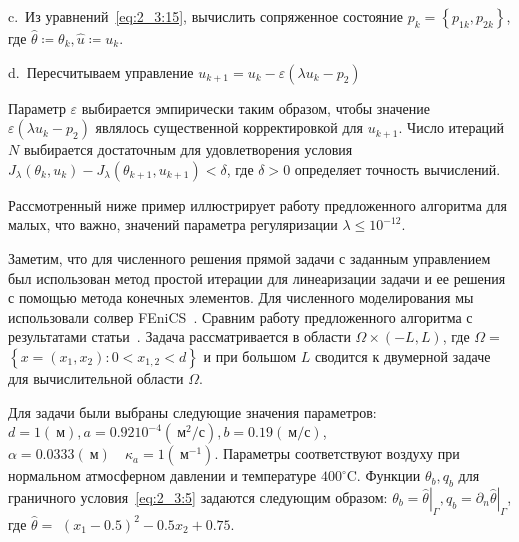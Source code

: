 \hspace{1cm} c.\ Из уравнений~\eqref{eq:2_3:15}, вычислить сопряженное
состояние $p_{k}=\left\{p_{1 k}, p_{2 k}\right\}$,
где $\widehat{\theta} \coloneqq \theta_{k}, \widehat{u} \coloneqq u_{k}$.

\hspace{1cm} d.\ Пересчитываем управление
$u_{k+1}=u_{k}-\varepsilon\left(\lambda u_{k}-p_{2}\right)$

Параметр $\varepsilon$ выбирается эмпирически таким образом, чтобы
значение $\varepsilon\left(\lambda u_{k}-p_{2}\right)$ являлось
существенной корректировкой для $u_{k+1}$.
Число итераций $N$ выбирается достаточным для
удовлетворения условия $J_{\lambda}\left(\theta_{k}, u_{k}\right)
-J_{\lambda}\left(\theta_{k+1}, u_{k+1}\right)<\delta$, где $\delta>0$
определяет точность вычислений.

Рассмотренный ниже пример иллюстрирует работу предложенного
алгоритма для малых, что важно, значений параметра регуляризации
$\lambda \leq 10^{-12}$.


Заметим, что для численного решения прямой задачи с заданным управлением
был использован метод простой итерации для линеаризации задачи и ее решения
с помощью метода конечных элементов.
Для численного моделирования мы использовали солвер FEniCS~\cite{fenics, dolfin}.
Сравним работу предложенного
алгоритма с результатами статьи~\cite{Chebotarev2019Problem}.
Задача рассматривается в области $\Omega \times(-L, L)$,
где $\Omega=$ $\left\{x=\left(x_{1}, x_{2}\right): 0<x_{1,2}<d\right\}$
и при большом $L$ сводится к двумерной задаче для вычислительной
области $\Omega$.

Для задачи были выбраны следующие значения параметров:
$d=1(\mathrm{~м}), a=0.9210^{-4}\left(\mathrm{~м}^{2} / \mathrm{с}\right),
b=0.19(\mathrm{~м} / \mathrm{с})$, $\alpha=0.0333(\mathrm{~м})
\quad \kappa_{a}=1\left(\mathrm{~м}^{-1}\right)$.
Параметры соответствуют воздуху при нормальном атмосферном давлении
и температуре $400^{\circ} \mathrm{C}$.
Функции $\theta_{b}, q_{b}$ для граничного условия~\eqref{eq:2_3:5}
задаются следующим образом: $\theta_{b}=\left.\widehat{\theta}\right|_{\Gamma},
q_{b}=\left.\partial_{n} \widehat{\theta}\right|_{\Gamma}$,
где $\widehat{\theta}=$ $\left(x_{1}-0.5\right)^{2}-0.5 x_{2}+0.75$.


